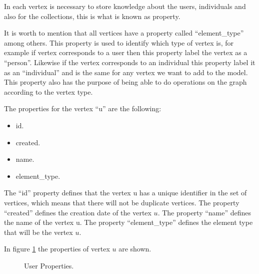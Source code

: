 \documentclass[conference]{IEEEtran}
\begin{document}
In each vertex is necessary to store knowledge about the users, individuals and
also for the collections, this is what is known as property.

It is worth to mention that all vertices have a property called “element\_type”
among others. This property is used to identify which type of vertex is, for
example if vertex corresponds to a user then this property label the vertex as a
“person”. Likewise if the vertex corresponds to an individual this property
label it as an “individual” and is the same for any vertex we want to add to the
model. This property also has the purpose of being able to do operations on the
graph according to the vertex type.

The properties for the vertex “u” are the following:

\begin{itemize} 
\item id.  
\item created.
\item name.
\item element\_type.
\end{itemize}

The “id” property defines that the vertex u has a unique identifier in the set
of vertices, which means that there will not be duplicate vertices. The property
“created” defines the creation date of the vertex $u$. The property “name”
defines the name of the vertex u. The property “element\_type” defines the
element type that will be the vertex $u$.

In figure \ref{fig:User_node} the properties of vertex $u$  are shown.

\begin{figure}
\captionsetup{justification=centering,margin=2cm}
\centering
\setlength\fboxsep{0pt}
\setlength\fboxrule{0.7pt}
\caption{User Properties.}
\label{fig:User_node}       
\end{figure}
\end{document}
